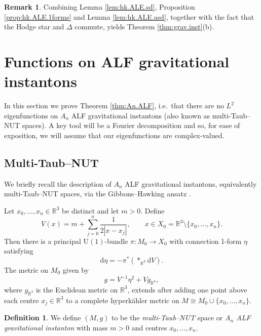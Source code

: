 \documentclass{article}
\theoremstyle{definition}
\newtheorem{dfn}[thm]{Definition}
\newtheorem{rmk}[thm]{Remark}
\numberwithin{thm}{section}
\numberwithin{equation}{section}
\def\R{\mathbb{R}}
\newcommand{\dd}{\mathrm d}
\begin{document}
\begin{rmk}
Combining Lemma \ref{lem:hk.ALE.sd}, Proposition \ref{prop:hk.ALE.1forms} and Lemma \ref{lem:hk.ALE.asd}, together with the fact that the Hodge star and $\Delta$ commute, yields Theorem \ref{thm:grav.inst}(b).
\end{rmk}

 

\section{Functions on ALF gravitational instantons}\label{sec:funct.ALF}

In this section we prove Theorem \ref{thm:An.ALF}, i.e.~that there are no $L^2$ eigenfunctions on $A_{n}$ ALF gravitational instantons (also known as multi-Taub--NUT spaces).  A key tool will be a Fourier decomposition and so, for ease of exposition, we will assume that our eigenfunctions are complex-valued.

\subsection{Multi-Taub--NUT}

We briefly recall the description of $A_{n}$ ALF gravitational instantons, equivalently multi-Taub--NUT spaces, via the Gibbons--Hawking ansatz \cite{GibbonsHawking,Minerbe2011}.  

Let $x_0,\ldots,x_n\in\R^3$ be distinct and let $m>0$.  Define
\begin{equation}\label{eq:V}
        V(x)=m+\sum_{j=0}^n\frac{1}{2|x-x_j|},
        \qquad
        x\in X_0=\R^3\setminus\{x_0,\ldots,x_n\}.
\end{equation}
Then there is a principal $\mathrm{U}(1)$-bundle $\pi:M_0\to X_0$ with connection 1-form $\eta$ satisfying
\begin{equation}\label{eq:curvature}
        \dd\eta=-\pi^*(*_{\R^3}\dd V).
\end{equation}
The metric on $M_0$ given by
\begin{equation}\label{eq:metric}
        g=V^{-1}\eta^2+V g_{\R^3},
\end{equation}
 where $g_{\R^3}$ is the Euclidean metric on $\R^3$, 
extends after adding one point above each centre $x_j\in \R^3$ to a   complete hyperk\"ahler metric on $M\cong M_0\cup\{x_0,\ldots,x_n\}$. 

\begin{dfn}\label{dfn:An.ALF}
We define $(M,g)$ to be the \emph{multi-Taub--NUT} space or \emph{$A_{n}$ ALF gravitational instanton} with mass $m>0$ and centres $x_0,\ldots,x_n$.    
\end{dfn}
\end{document}
